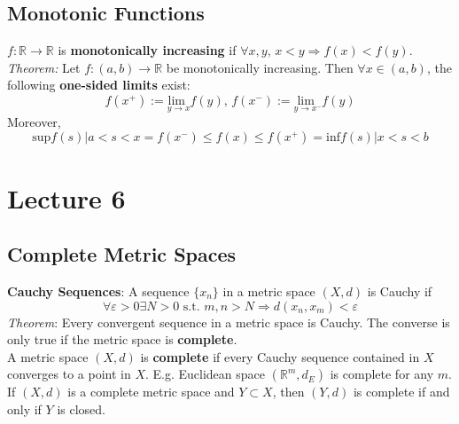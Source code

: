 \documentclass{article}
\newcommand{\R}{\mathbb{R}}
\begin{document}
\subsection{Monotonic Functions}
$f:\R\rightarrow\R$ is \textbf{monotonically increasing} if $\forall x,y$, $x<y\Rightarrow f(x)<f(y)$.
\smallskip \\
\textit{Theorem:} Let $f:(a,b)\rightarrow\R$ be monotonically increasing. Then $\forall x\in(a,b)$, the following \textbf{one-sided limits} exist:
\[
	f(x^+):=\underset{y\rightarrow x}{\text{lim }}f(y)\text{,  }f(x^-):=\underset{y\rightarrow x^-}{\text{lim }}f(y)
\]
Moreover,
\[
	\text{sup}{f(s)|a<s<x}=f(x^-)\leq f(x)\leq f(x^+)=\text{inf}{f(s)|x<s<b}
\]



\section{Lecture 6}

\subsection{Complete Metric Spaces}
\textbf{Cauchy Sequences}: A sequence $\{x_n\}$ in a metric space $(X,d)$ is Cauchy if
\[
	\forall\varepsilon>0\exists N>0\text{ s.t. }m,n>N\Rightarrow d(x_n,x_m)<\varepsilon
\]
\textit{Theorem}: Every convergent sequence in a metric space is Cauchy. The converse is only true if the metric space is \textbf{complete}.
\medskip \\
A metric space $(X,d)$ is \textbf{complete} if every Cauchy sequence contained in $X$ converges to a point in $X$. E.g. Euclidean space $(\R^m,d_E)$ is complete for any $m$.
\smallskip
If $(X,d)$ is a complete metric space and $Y\subset X$, then $(Y,d)$ is complete if and only if $Y$ is closed.
\end{document}
